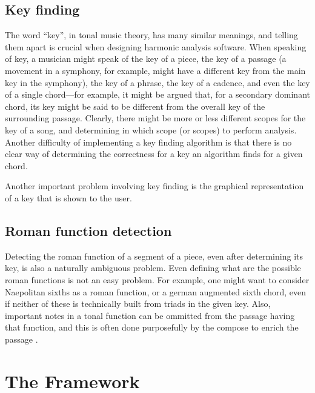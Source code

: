\subsection{Key finding}
\label{sec:key-finding}

The word ``key'', in tonal music theory, has many similar meanings,
and telling them apart is crucial when designing harmonic analysis
software. When speaking of key, a musician might speak of the key of a
piece, the key of a passage (a movement in a symphony, for example,
might have a different key from the main key in the symphony), the key
of a phrase, the key of a cadence, and even the key of a single
chord---for example, it might be argued that, for a secondary dominant
chord, its key might be said to be different from the overall key of
the surrounding passage. Clearly, there might be more or less
different scopes for the key of a song, and determining in which scope
(or scopes) to perform analysis. Another difficulty of implementing a
key finding algorithm is that there is no clear way of determining the
correctness for a key an algorithm finds for a given chord.

Another important problem involving key finding is the graphical
representation of a key that is shown to the user.

\subsection{Roman function detection}
\label{sec:roman-funct-detect}

Detecting the roman function of a segment of a piece, even after
determining its key, is also a naturally ambiguous problem. Even
defining what are the possible roman functions is not an easy problem.
For example, one might want to consider Naepolitan sixths as a roman
function, or a german augmented sixth chord, even if neither of these
is technically built from triads in the given key. Also, important
notes in a tonal function can be ommitted from the passage having that
function, and this is often done purposefully by the compose to enrich
the passage \cite{schoenberg83:theory}.


\section{The Framework}
\label{sec:framework}

